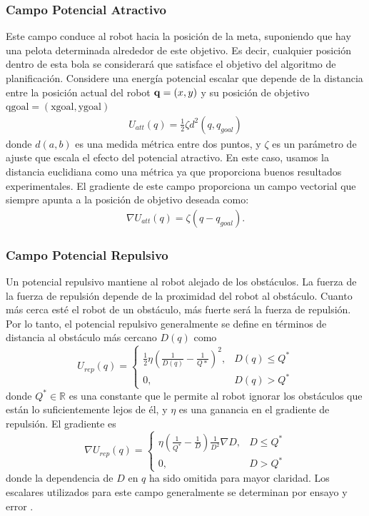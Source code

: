 \subsubsection{Campo Potencial Atractivo}
Este campo conduce al robot hacia la posici\'on de la meta, suponiendo que 
hay una pelota determinada alrededor de este objetivo. Es decir, cualquier 
posici\'on dentro de esta bola se considerar\'a que satisface el objetivo 
del algoritmo de planificaci\'on. Considere una energ\'ia potencial escalar 
que depende de la distancia entre la posici\'on actual del robot $\mathbf q=(x,y)$ y 
su posici\'on de objetivo $\text{qgoal}=(\text{xgoal},\text{ygoal})$
\begin{align}
\label{eqn:pot_attr}
U_{att}(q) = \frac{1}{2}\zeta d^{2} (q,q_{goal})
\end{align}
donde $d(a,b)$ es una medida m\'etrica entre dos puntos, y $\zeta$ es un 
par\'ametro de ajuste que escala el efecto del potencial atractivo. En este 
caso, usamos la distancia euclidiana como una m\'etrica ya que proporciona 
buenos resultados experimentales. El gradiente de este campo proporciona un 
campo vectorial que siempre apunta a la posici\'on de objetivo deseada como:
\begin{align}
\label{eqn:gradient_att}
\nabla U_{att}(q)=\zeta(q-q_{goal}).
\end{align}

\subsubsection{Campo Potencial Repulsivo}
Un potencial repulsivo mantiene al robot alejado de los obst\'aculos. La 
fuerza de la fuerza de repulsi\'on depende de la proximidad del robot al 
obst\'aculo. Cuanto m\'as cerca est\'e el robot de un obst\'aculo, m\'as 
fuerte ser\'a la fuerza de repulsi\'on. Por lo tanto, el potencial 
repulsivo generalmente se define en t\'erminos de distancia al obst\'aculo 
m\'as cercano $D(q)$ como 
\begin{equation}
U_{rep}(q) =
\begin{cases}
	\frac{1}{2}\eta(\frac{1}{D(q)} - \frac{1}{Q*})^2, & D(q)\leq Q^* \\
	0, & D(q) > Q^*
\end{cases}
\label{eq:pot_rep}
\end{equation}
donde $Q^* \in \mathbb R$ es una constante que le permite al robot ignorar 
los obst\'aculos que est\'an lo suficientemente lejos de \'el, y $\eta$ es 
una ganancia en el gradiente de repulsi\'on. El gradiente es 
\begin{equation}
\nabla U_{rep}(q) =
\begin{cases}
	\eta(\frac{1}{Q^*} - \frac{1}{D})\frac{1}{D^2} \nabla D, & D \leq Q^* \\
	0, & D > Q^*
\end{cases}
\label{eqn:gradient_rep}
\end{equation}
donde la dependencia de $D$ en $q$ ha sido omitida para mayor claridad. Los 
escalares utilizados para este campo generalmente se determinan por ensayo 
y error \cite{choset2005principles}.

